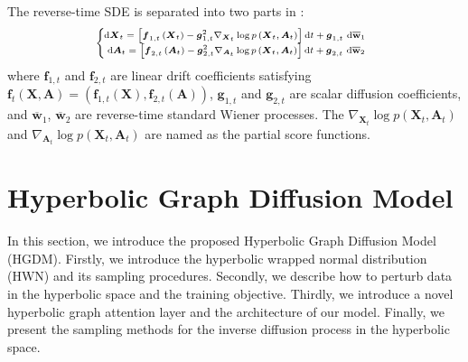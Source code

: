 \documentclass[letterpaper]{article} %
\begin{document}
The reverse-time SDE is separated into two parts in \cite{jo2022score}:
\begin{equation}
\begin{scriptsize}{
\left\{\hspace{-0.2cm}\begin{array}{l}
\mathrm{d} \boldsymbol{X}_{t}=\left[\boldsymbol{f}_{1, t}\left(\boldsymbol{X}_{t}\right)-\boldsymbol{g}_{1, t}^{2} \nabla_{\boldsymbol{X}_{t}} \log p\left(\boldsymbol{X}_{t}, \boldsymbol{A}_{t}\right)\right] \mathrm{d}t+\boldsymbol{g}_{1, t} \mathrm{~d} \overline{\mathbf{w}}_{1} \\
\mathrm{~d} \boldsymbol{A}_{t}=\left[\boldsymbol{f}_{2, t}\left(\boldsymbol{A}_{t}\right)-\boldsymbol{g}_{2, t}^{2} \nabla_{\boldsymbol{A}_{t}} \log p\left(\boldsymbol{X}_{t}, \boldsymbol{A}_{t}\right)\right] \mathrm{d}t+\boldsymbol{g}_{2, t} \mathrm{~d} \overline{\mathbf{w}}_{2}
\end{array}\right.
}\end{scriptsize}
\end{equation}
where $\boldsymbol{f}_{1,t}$ and $\boldsymbol{f}_{2,t}$ are linear drift coefficients
satisfying $\boldsymbol{f}_{t}(\boldsymbol{X}, \boldsymbol{A})=\left(\boldsymbol{f}_{1, t}(\boldsymbol{X}), \boldsymbol{f}_{2, t}(\boldsymbol{A})\right)$,
$\boldsymbol{g}_{1,t}$ and $\boldsymbol{g}_{2,t}$ are scalar diffusion coefficients, and  $\overline{\mathbf{w}}_{1}$,  $\overline{\mathbf{w}}_{2}$ are reverse-time standard Wiener processes. The $\nabla_{\boldsymbol{X}_{t}} \log p\left(\boldsymbol{X}_{t}, \boldsymbol{A}_{t}\right)$ and $\nabla_{\boldsymbol{A}_{t}} \log p\left(\boldsymbol{X}_{t}, \boldsymbol{A}_{t}\right)$ are 
named as the partial score functions.

\section{Hyperbolic Graph Diffusion Model}
In this section, we introduce the proposed Hyperbolic Graph Diffusion Model (HGDM).
Firstly, we introduce the hyperbolic wrapped normal distribution (HWN) and its sampling procedures.
Secondly, we describe how to perturb data in the hyperbolic space and the training objective. 
Thirdly, we introduce a novel hyperbolic graph attention layer and the architecture of our model. 
Finally, we present the sampling methods for the inverse diffusion process in the hyperbolic space.
\end{document}
